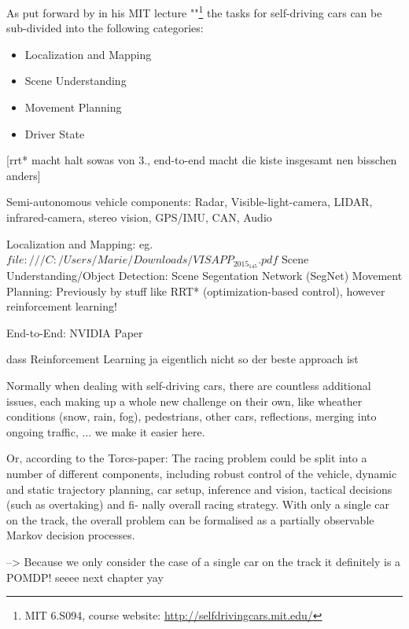 As put forward by  in his MIT lecture ""\footnote{MIT 6.S094, course website: \url{http://selfdrivingcars.mit.edu/}} the tasks for self-driving cars can be sub-divided into the following categories: 
\begin{itemize} \bfseries
	\item Localization and Mapping
	\item Scene Understanding
	\item Movement Planning
	\item Driver State
\end{itemize}
[rrt* macht halt sowas von 3., end-to-end macht die kiste insgesamt nen bisschen anders]


Semi-autonomous vehicle components: Radar, Visible-light-camera, LIDAR, infrared-camera, stereo vision, GPS/IMU, CAN, Audio

Localization and Mapping: eg. $file:///C:/Users/Marie/Downloads/VISAPP_2015_145.pdf$
Scene Understanding/Object Detection: Scene Segentation Network (SegNet)
Movement Planning: Previously by stuff like RRT* (optimization-based control), however reinforcement learning!

End-to-End: NVIDIA Paper

dass Reinforcement Learning ja eigentlich nicht so der beste approach ist


Normally when dealing with self-driving cars, there are countless additional issues, each making up a whole new challenge on their own, like wheather conditions (snow, rain, fog), pedestrians, other cars, reflections, merging into ongoing traffic, ...
we make it easier here.

Or, according to the Torcs-paper:
The racing problem could be split into a number of different components, including
robust control of the vehicle, dynamic and static trajectory planning,
car setup, inference and vision, tactical decisions (such as overtaking) and fi-
nally overall racing strategy. With only a single car on the track, the overall
problem can be formalised as a partially observable Markov decision processes.



--> Because we only consider the case of a  single car on the track it definitely is a POMDP! seeee next chapter yay
